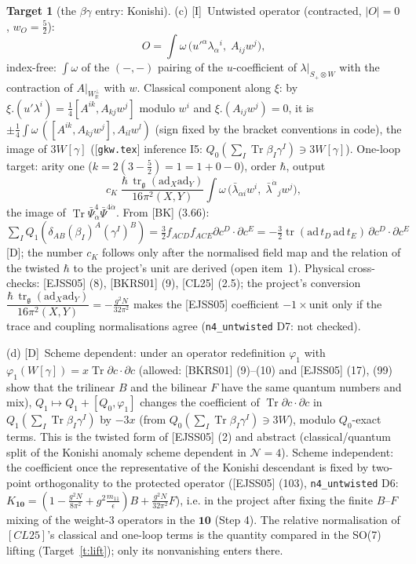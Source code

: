 \documentclass[11pt]{article}
\theoremstyle{definition}
\newtheorem{target}{Target}
\newcommand{\Tr}{\operatorname{Tr}}
\newcommand{\tr}{\operatorname{tr}}
\newcommand{\Dl}{\textup{[D]}}
\newcommand{\Il}{\textup{[I]}}
\newcommand{\unit}{\dfrac{\hbar\,\tr_{\mathfrak g}(\mathrm{ad}_X\mathrm{ad}_Y)}{16\pi^2(X,Y)}}
\begin{document}
\begin{target}[the $\beta\gamma$ entry: Konishi]
(c) \Il\ Untwisted operator (contracted, $|O|=0$, $w_O=\tfrac52$):
\[
O=\int\omega\,\big(u'^\alpha\lambda_\alpha{}^i,\;A_{ij}w^j\big),
\]
index-free: $\int\omega$ of the $(-,-)$ pairing of the $u$-coefficient of $\lambda|_{S_+\otimes W}$ with the contraction of $A|_{W_{\mathbb R}^\perp}$ with $w$. Classical component along $\xi$: by $\xi.(u'\lambda^i)=\tfrac14[A^{ik},A_{kj}w^j]$ modulo $w^i$ and $\xi.(A_{ij}w^j)=0$, it is $\pm\tfrac14\int\omega\,([A^{ik},A_{kj}w^j],A_{il}w^l)$ (sign fixed by the bracket conventions in code), the image of $3W[\gamma]$ ([\texttt{gkw.tex}] inference I5: $Q_0(\sum_I\Tr\beta_I\gamma^I)\ni3W[\gamma]$). One-loop target: arity one ($k=2(3-\tfrac52)=1=1+0-0$), order $\hbar$, output
\[
c_K\;\unit\int\omega\,\big(\bar\lambda_{\dot\alpha i}w^i,\;\bar\lambda^{\dot\alpha}{}_jw^j\big),
\]
the image of $\Tr\bar\Psi^4_{\dot\alpha}\bar\Psi^{4\dot\alpha}$. From [BK] (3.66): $\sum_IQ_1(\delta_{AB}(\beta_I)^A(\gamma^I)^B)=\tfrac32f_{ACD}f_{ACE}\partial c^D\cdot\partial c^E=-\tfrac32\tr(\mathrm{ad}\,t_D\,\mathrm{ad}\,t_E)\,\partial c^D\cdot\partial c^E$ \Dl; the number $c_K$ follows only after the normalised field map and the relation of the twisted $\hbar$ to the project's unit are derived (open item~1). Physical cross-checks: [EJSS05] (8), [BKRS01] (9), [CL25] (2.5); the project's conversion $\unit=-\frac{g^2N}{32\pi^2}$ makes the [EJSS05] coefficient $-1\times$unit only if the trace and coupling normalisations agree (\texttt{n4\_untwisted} D7: not checked).

(d) \Dl\ Scheme dependent: under an operator redefinition $\varphi_1$ with $\varphi_1(W[\gamma])=x\Tr\partial c\cdot\partial c$ (allowed: [BKRS01] (9)--(10) and [EJSS05] (17), (99) show that the trilinear $B$ and the bilinear $F$ have the same quantum numbers and mix), $Q_1\mapsto Q_1+[Q_0,\varphi_1]$ changes the coefficient of $\Tr\partial c\cdot\partial c$ in $Q_1(\sum_I\Tr\beta_I\gamma^I)$ by $-3x$ (from $Q_0(\sum_I\Tr\beta_I\gamma^I)\ni3W$), modulo $Q_0$-exact terms. This is the twisted form of [EJSS05] (2) and abstract (classical/quantum split of the Konishi anomaly scheme dependent in $\mathcal N=4$). Scheme independent: the coefficient once the representative of the Konishi descendant is fixed by two-point orthogonality to the protected operator ([EJSS05] (103), \texttt{n4\_untwisted} D6: $K_{\mathbf{10}}=(1-\frac{g^2N}{8\pi^2}+g^2\frac{m_{11}}\epsilon)B+\frac{g^2N}{32\pi^2}F$), i.e. in the project after fixing the finite $B$--$F$ mixing of the weight-3 operators in the $\mathbf{10}$ (Step 4). The relative normalisation of $[CL25]$'s classical and one-loop terms is the quantity compared in the SO(7) lifting (Target~\ref{t:lift}); only its nonvanishing enters there.
\end{target}
\end{document}
